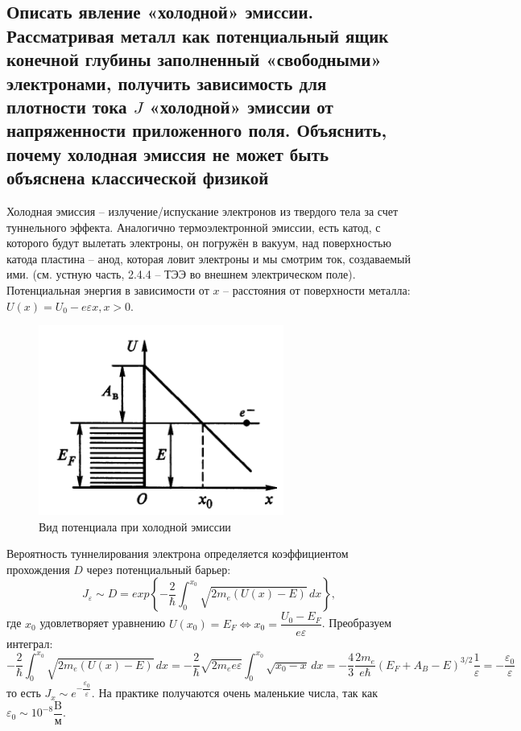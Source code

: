 \subsection{Описать явление «холодной» эмиссии. Рассматривая металл как потенциальный ящик
конечной глубины заполненный «свободными» электронами, получить зависимость для плотности
тока $J$ «холодной» эмиссии от напряженности приложенного поля. Объяснить, почему холодная
эмиссия не может быть объяснена классической физикой}

Холодная эмиссия -- излучение/испускание электронов из твердого тела за счет туннельного
эффекта. Аналогично термоэлектронной эмиссии, есть катод, с которого будут вылетать электроны,
он погружён в вакуум, над поверхностью катода пластина -- анод, которая ловит электроны и мы 
смотрим ток, создаваемый ими. (см. устную часть, 2.4.4 -- ТЭЭ во внешнем электрическом поле).
Потенциальная энергия в зависимости от $x$ -- расстояния от поверхности металла: 
$U(x) = U_0 - e \varepsilon x, x>0$.
\begin{figure}[H]
  \centering
  \includegraphics[width=.7\linewidth]{img/write-08/barier.png}
  \caption{Вид потенциала при холодной эмиссии}
  \label{fig:cold-emission}
\end{figure}

Вероятность туннелирования электрона определяется
коэффициентом прохождения $D$ через потенциальный барьер:
\[
  J_{\varepsilon} \sim D = exp \left\{ - \dfrac{2}{\hbar} \int_0^{x_0} \sqrt{2m_e (U(x) - E)} \, dx \right\},
\]
где $x_0$ удовлетворяет уравнению
$U(x_0) = E_F \Leftrightarrow x_0 = \dfrac{U_0 - E_F}{e \varepsilon}$. Преобразуем интеграл:
\[
  - \dfrac{2}{\hbar} \int_0^{x_0} \sqrt{2m_e (U(x) - E)} \, dx 
  = - \dfrac{2}{\hbar} \sqrt{2m_e e \varepsilon} \int_0^{x_0} \sqrt{ x_0 - x } \, dx
  = - \dfrac{4}{3} \dfrac{2m_e}{e\hbar} (E_F + A_B - E)^{3/2} \dfrac{1}{\varepsilon}
  = - \dfrac{\varepsilon_0}{\varepsilon}
\]
то есть $J_x \sim e^{- \dfrac{\varepsilon_0}{\varepsilon}}$. На практике получаются очень
маленькие числа, так как $\varepsilon_0 \sim 10^{-8} \dfrac{\text{B}}{\text{м}}$.
